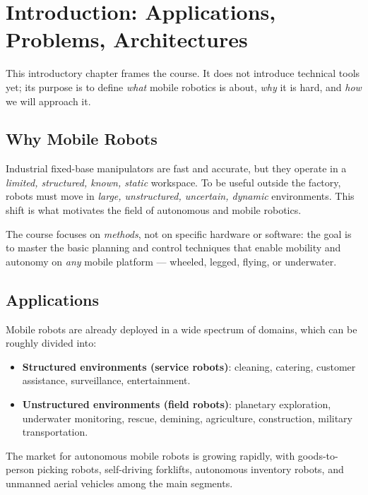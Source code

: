 \chapter{Introduction: Applications, Problems, Architectures}
\label{ch:introduction}

This introductory chapter frames the course. It does not introduce
technical tools yet; its purpose is to define \emph{what} mobile robotics
is about, \emph{why} it is hard, and \emph{how} we will approach it.

\section{Why Mobile Robots}
\label{sec:why-mobile-robots}

Industrial fixed-base manipulators are fast and accurate, but they operate
in a \emph{limited, structured, known, static} workspace. To be useful
outside the factory, robots must move in \emph{large, unstructured,
uncertain, dynamic} environments. This shift is what motivates the field
of autonomous and mobile robotics.

The course focuses on \emph{methods}, not on specific hardware or
software: the goal is to master the basic planning and control techniques
that enable mobility and autonomy on \emph{any} mobile platform ---
wheeled, legged, flying, or underwater.

\section{Applications}
\label{sec:applications}

Mobile robots are already deployed in a wide spectrum of domains, which
can be roughly divided into:

\begin{itemize}
    \item \textbf{Structured environments (service robots)}: cleaning,
          catering, customer assistance, surveillance, entertainment.
    \item \textbf{Unstructured environments (field robots)}: planetary
          exploration, underwater monitoring, rescue, demining,
          agriculture, construction, military transportation.
\end{itemize}

The market for autonomous mobile robots is growing rapidly, with
goods-to-person picking robots, self-driving forklifts, autonomous
inventory robots, and unmanned aerial vehicles among the main segments.

